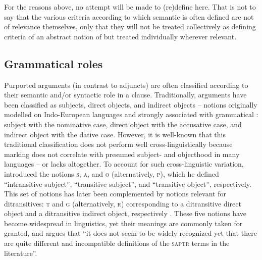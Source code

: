 For the reasons above, no attempt will be made to (re)define  here. That is not to say that the various criteria according to which semantic  is often defined are not of relevance themselves, only that they will not be treated collectively as defining criteria of an abstract notion of  but treated individually wherever relevant.  

\subsection{Grammatical roles} \label{grammatical-roles}
Purported arguments (in contrast to adjuncts) are often classified according to their semantic and/or syntactic role in a clause. Traditionally, arguments have been classified as subjects, direct objects, and indirect objects -- notions originally modelled on Indo-European languages and strongly associated with grammatical : subject with the nominative case, direct object with the accusative case, and indirect object with the dative case. However, it is well-known that this traditional classification does not perform well cross-linguistically because  marking does not correlate with presumed subject- and objecthood in many languages -- or lacks altogether. To account for such cross-linguistic variation, \cite[59, 128]{dixon:1972} introduced the notions \textsc{s}, \textsc{a}, and \textsc{o} (alternatively, \textsc{p}), which he defined “intransitive subject”, “transitive subject”, and “transitive object”, respectively. This set of notions has later been complemented by notions relevant for ditransitives: \textsc{t} and \textsc{g} (alternatively, \textsc{r}) corresponding to a ditransitive direct object and a ditransitive indirect object, respectively \citep{croft:1990}. These five notions have become widespread in linguistics, yet their meanings are commonly taken for granted, and \cite[536]{haspelmath:2011a} argues that “it does not seem to be widely recognized yet that there are quite different and incompatible definitions of the \textsc{saptr} terms in the literature”.

